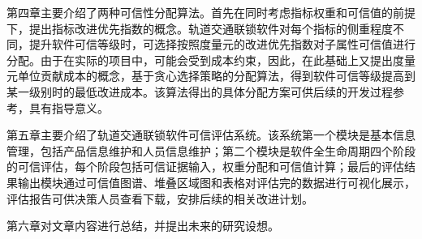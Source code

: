 第四章主要介绍了两种可信性分配算法。首先在同时考虑指标权重和可信值的前提下，提出指标改进优先指数的概念。轨道交通联锁软件对每个指标的侧重程度不同，提升软件可信等级时，可选择按照度量元的改进优先指数对子属性可信值进行分配。由于在实际的项目中，可能会受到成本约束，因此，在此基础上又提出度量元单位贡献成本的概念，基于贪心选择策略的分配算法，得到软件可信等级提高到某一级别时的最低改进成本。该算法得出的具体分配方案可供后续的开发过程参考，具有指导意义。

第五章主要介绍了轨道交通联锁软件可信评估系统。该系统第一个模块是基本信息管理，包括产品信息维护和人员信息维护；第二个模块是软件全生命周期四个阶段的可信评估，每个阶段包括可信证据输入，权重分配和可信值计算；最后的评估结果输出模块通过可信值图谱、堆叠区域图和表格对评估完的数据进行可视化展示，评估报告可供决策人员查看下载，安排后续的相关改进计划。

第六章对文章内容进行总结，并提出未来的研究设想。




